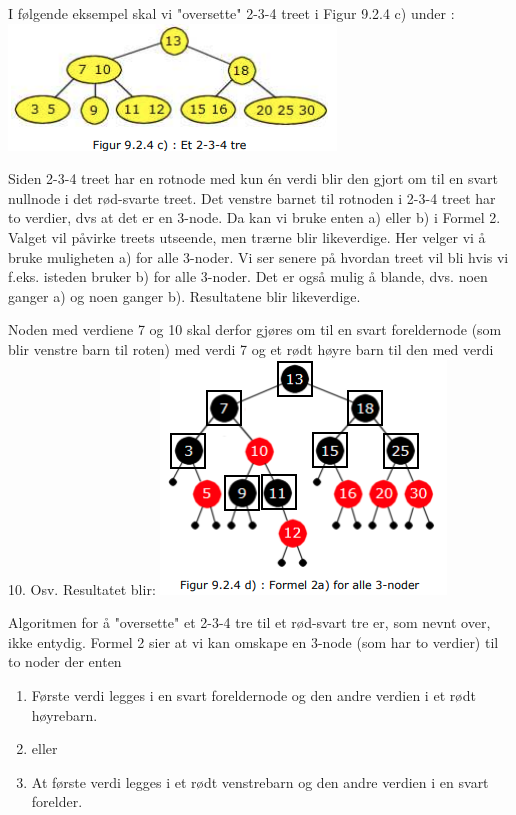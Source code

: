 \documentclass[11pt]{article}
\begin{document}
        I følgende eksempel skal vi "oversette" 2-3-4 treet i Figur 9.2.4 c) under :\\

        \includegraphics[center]{figur-9.2.4c.png}

        Siden 2-3-4 treet har en rotnode med kun én verdi blir den gjort om til en svart nullnode i det
        rød-svarte treet. Det venstre barnet til rotnoden i 2-3-4 treet har to verdier, dvs at det er en
        3-node.
        Da kan vi bruke enten a) eller b) i Formel 2. Valget vil påvirke treets utseende, men
        trærne blir likeverdige. Her velger vi å bruke muligheten a) for alle 3-noder. Vi ser senere på
        hvordan treet vil bli hvis vi f.eks. isteden bruker b) for alle 3-noder. Det er også mulig å
        blande, dvs. noen ganger a) og noen ganger b). Resultatene blir likeverdige.

        \begin{multicols}{2}
            Noden med verdiene 7 og 10 skal derfor gjøres om til en svart foreldernode (som blir venstre
            barn til roten) med verdi 7 og et rødt høyre barn til den med verdi 10. Osv. Resultatet blir:
            \columnbreak
            \includegraphics[center]{figur-9.2.4d.png}
        \end{multicols}



        Algoritmen for å "oversette" et 2-3-4 tre til et rød-svart tre er, som nevnt over, ikke entydig.
        Formel 2 sier at vi kan omskape en 3-node (som har to verdier) til to noder der enten
        \begin{enumerate}[nosep]
            \item Første verdi legges i en svart foreldernode og den andre verdien i et rødt høyrebarn.
            \item[] eller
            \item At første verdi legges i et rødt venstrebarn og den andre verdien i en svart forelder.
        \end{enumerate}
\end{document}
